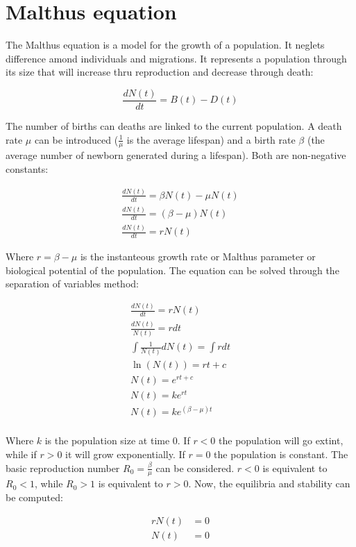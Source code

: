\section{Malthus equation}
The Malthus equation is a model for the growth of a population.
It neglets difference amond individuals and migrations.
It represents a population through its size that will increase thru reproduction and decrease through death:

$$\frac{dN(t)}{dt} = B(t) - D(t)$$

The number of births can deaths are linked to the current population.
A death rate $\mu$ can be introduced ($\frac{1}{\mu}$ is the average lifespan) and a birth rate $\beta$ (the average number of newborn generated during a lifespan).
Both are non-negative constants:

\begin{align*}
  \frac{dN(t)}{dt} = \beta N(t) - \mu N(t)\\
  \frac{dN(t)}{dt} = (\beta - \mu)N(t)\\
  \frac{dN(t)}{dt} = rN(t)
\end{align*}

Where $r = \beta-\mu$ is the instanteous growth rate or Malthus parameter or biological potential of the population.
The equation can be solved through the separation of variables method:

\begin{align*}
  \frac{dN(t)}{dt} = rN(t)\\
  \frac{dN(t)}{N(t)} = rdt\\
  \int\frac{1}{N(t)}dN(t) = \int rdt\\
  \ln(N(t)) = rt + c\\
  N(t) = e^{rt + c}\\
  N(t) = ke^{rt}\\
  N(t) = ke^{(\beta-\mu)t}\\
\end{align*}

Where $k$ is the population size at time $0$.
If $r<0$ the population will go extint, while if $r>0$ it will grow exponentially.
If $r=0$ the population is constant.
The basic reproduction number $R_0=\frac{\beta}{\mu}$ can be considered.
$r<0$ is equivalent to $R_0<1$, while $R_0>1$ is equivalent to $r>0$.
Now, the equilibria and stability can be computed:

\begin{align*}
  rN(t) &= 0\\
  N(t) &= 0
\end{align*}

